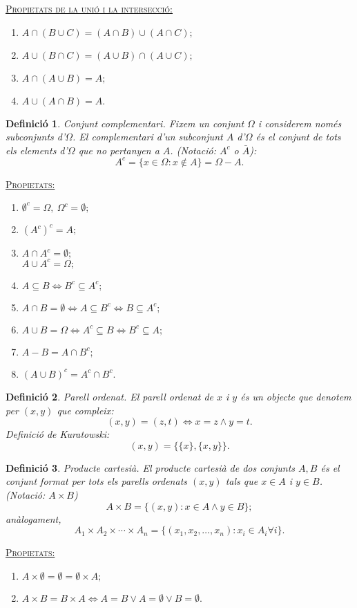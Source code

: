 \documentclass[11pt]{article}
\newcommand{\propietats}{\underline{{\scshape Propietats:}}}
\newtheorem{defi}{Definició}[section]
\begin{document}
\underline{{\scshape Propietats de la unió i la intersecció:}}
\begin{enumerate}
	\item $A\cap(B\cup C)=(A\cap B)\cup(A\cap C);$
	\item $A\cup(B\cap C)=(A\cup B)\cap(A\cup C);$
	\item $A\cap(A\cup B)=A;$
	\item $A\cup(A\cap B)=A.$
\end{enumerate}
\begin{defi}
Conjunt complementari. Fixem un conjunt $\Omega$ i considerem només subconjunts d'$\Omega$. El complementari d'un subconjunt $A$ d'$\Omega$ és el conjunt de tots els elements d'$\Omega$ que no pertanyen a $A$. (Notació: $A^c$ o $\bar{A}$):
$$A^c=\{x\in\Omega:x\not\in A\}=\Omega-A.$$
\end{defi}
\propietats
\begin{enumerate}
	\item $\emptyset^c=\Omega,\ \Omega^c=\emptyset;$
	\item $(A^c)^c=A;$
	\item $A\cap A^c=\emptyset;$\\
	$A\cup A^c=\Omega;$
	\item $A\subseteq B\iff B^c\subseteq A^c;$
	\item $A\cap B=\emptyset\iff A\subseteq B^c\iff B\subseteq A^c;$
	\item $A\cup B=\Omega\iff A^c\subseteq B\iff B^c\subseteq A;$
	\item $A-B=A\cap B^c;$
	\item $(A\cup B)^c=A^c\cap B^c.$
\end{enumerate}
\begin{defi}
Parell ordenat. El parell ordenat de $x$ i $y$ és un objecte que denotem per $(x,y)$ que compleix:
$$(x,y)=(z,t)\iff x=z \wedge y=t.$$
Definició de Kuratowski:
$$(x,y)=\{\{x\},\{x,y\}\}.$$
\end{defi}
\begin{defi}
Producte cartesià. El producte cartesià de dos conjunts $A,B$ és el conjunt format per tots els parells ordenats $(x,y)$ tals que $x\in A$ i $y\in B$. (Notació: $A\times B$)
$$A\times B=\{(x,y):x\in A\wedge y\in B\};$$
anàlogament,
$$A_1\times A_2\times\cdots\times A_n=\{(x_1,x_2,\ldots,x_n):x_i\in A_i\forall i\}.$$
\end{defi}
\propietats
\begin{enumerate}
	\item $A\times\emptyset=\emptyset=\emptyset\times A;$
	\item $A\times B=B\times A\iff A=B\vee A=\emptyset\vee B=\emptyset.$
\end{enumerate}
\end{document}
